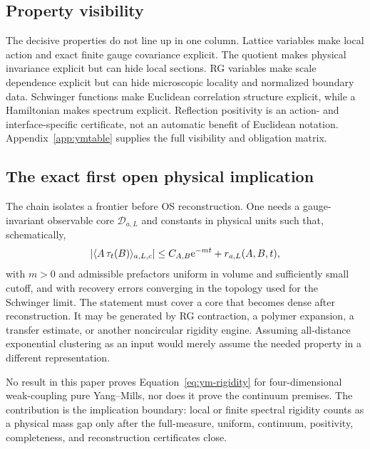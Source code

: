 \subsection{Property visibility}

The decisive properties do not line up in one column.  Lattice variables make
local action and exact finite gauge covariance explicit.  The quotient makes
physical invariance explicit but can hide local sections.  RG variables make
scale dependence explicit but can hide microscopic locality and normalized
boundary data.  Schwinger functions make Euclidean correlation structure
explicit, while a Hamiltonian makes spectrum explicit.  Reflection
positivity is an action- and interface-specific certificate, not an automatic
benefit of Euclidean notation.  Appendix~\ref{app:ymtable} supplies the full
visibility and obligation matrix.

\subsection{The exact first open physical implication}

The chain isolates a frontier before OS reconstruction.  One needs a
gauge-invariant observable core $\mathcal D_{a,L}$ and constants in physical
units such that, schematically,
\begin{equation}
\label{eq:ym-rigidity}
 \left|\langle A\,\tau_t(B)\rangle_{a,L,c}\right|
 \leq C_{A,B}\mathrm e^{-mt}+r_{a,L}(A,B,t),
\end{equation}
with $m>0$ and admissible prefactors uniform in volume and sufficiently small
cutoff, and with recovery errors converging in the topology used for the
Schwinger limit.  The statement must cover a core that becomes dense after
reconstruction.  It may be generated by RG contraction, a polymer expansion,
a transfer estimate, or another noncircular rigidity engine.  Assuming
all-distance exponential clustering as an input would merely assume the
needed property in a different representation.

No result in this paper proves Equation~\eqref{eq:ym-rigidity} for
four-dimensional weak-coupling pure Yang--Mills, nor does it prove the
continuum premises.  The contribution is the implication boundary: local or
finite spectral rigidity counts as a physical mass gap only after the
full-measure, uniform, continuum, positivity, completeness, and reconstruction
certificates close.
